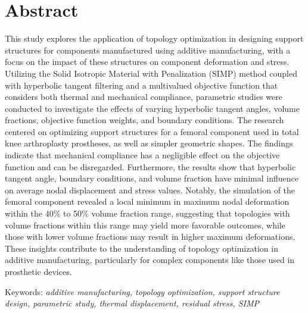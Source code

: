 \documentclass[../main.tex]{subfiles}
\begin{document}
\chapter*{Abstract}

 This study explores the application of topology optimization in designing support structures for components manufactured using additive manufacturing, with a focus on the impact of these structures on component deformation and stress. Utilizing the Solid Isotropic Material with Penalization (SIMP) method coupled with hyperbolic tangent filtering and a multivalued objective function that considers both thermal and mechanical compliance, parametric studies were conducted to investigate the effects of varying hyperbolic tangent angles, volume fractions, objective function weights, and boundary conditions. The research centered on optimizing support structures for a femoral component used in total knee arthroplasty prostheses, as well as simpler geometric shapes. The findings indicate that mechanical compliance has a negligible effect on the objective function and can be disregarded. Furthermore, the results show that hyperbolic tangent angle, boundary conditions, and volume fraction have minimal influence on average nodal displacement and stress values. Notably, the simulation of the femoral component revealed a local minimum in maximum nodal deformation within the 40\% to 50\% volume fraction range, suggesting that topologies with volume fractions within this range may yield more favorable outcomes, while those with lower volume fractions may result in higher maximum deformations. These insights contribute to the understanding of topology optimization in additive manufacturing, particularly for complex components like those used in prosthetic devices.

Keywords: \textit{additive manufacturing, topology optimization, support structure design, parametric study, thermal displacement, residual stress, SIMP}
\end{document}
